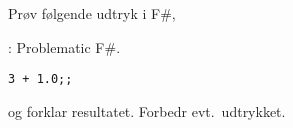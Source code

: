 Prøv følgende udtryk i F\#,
  \begin{codeNOutput}{: Problematic F\#.}
\begin{lstlisting}
3 + 1.0;;
\end{lstlisting}
\end{codeNOutput}
og forklar resultatet. Forbedr evt.\ udtrykket.
